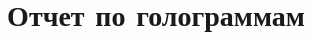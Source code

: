 \def\usetitle{}
\def\usegraphics{}



\title{Отчет по голограммам}


	
	\ifdefined\usetitle
	    
	\fi
	
	


